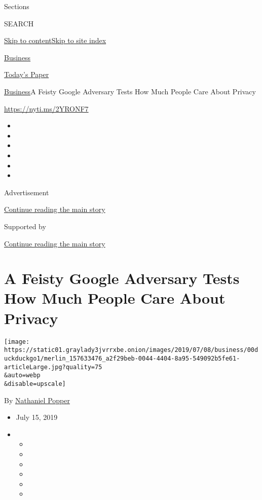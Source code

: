 Sections

SEARCH

\protect\hyperlink{site-content}{Skip to
content}\protect\hyperlink{site-index}{Skip to site index}

\href{https://www.nytimes3xbfgragh.onion/section/business}{Business}

\href{https://myaccount.nytimes3xbfgragh.onion/auth/login?response_type=cookie\&client_id=vi}{}

\href{https://www.nytimes3xbfgragh.onion/section/todayspaper}{Today's
Paper}

\href{/section/business}{Business}\textbar{}A Feisty Google Adversary
Tests How Much People Care About Privacy

\url{https://nyti.ms/2YRONF7}

\begin{itemize}
\item
\item
\item
\item
\item
\item
\end{itemize}

Advertisement

\protect\hyperlink{after-top}{Continue reading the main story}

Supported by

\protect\hyperlink{after-sponsor}{Continue reading the main story}

\hypertarget{a-feisty-google-adversary-tests-how-much-people-care-about-privacy}{%
\section{A Feisty Google Adversary Tests How Much People Care About
Privacy}\label{a-feisty-google-adversary-tests-how-much-people-care-about-privacy}}

\texttt{[image: https://static01.graylady3jvrrxbe.onion/images/2019/07/08/business/00duckduckgo1/merlin\_157633476\_a2f29beb-0044-4404-8a95-549092b5fe61-articleLarge.jpg?quality=75\\\&auto=webp\\\&disable=upscale]}

By
\href{https://www.nytimes3xbfgragh.onion/by/nathaniel-popper}{Nathaniel
Popper}

\begin{itemize}
\item
  July 15, 2019
\item
  \begin{itemize}
  \item
  \item
  \item
  \item
  \item
  \item
  \end{itemize}
\end{itemize}


